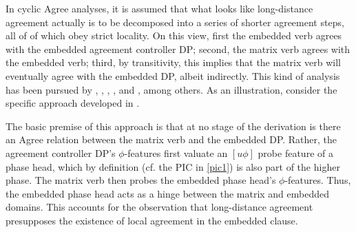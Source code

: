 \documentclass[output=paper
,modfonts
,nonflat]{langsci/langscibook}
\begin{document}
	In cyclic Agree analyses, it is assumed that what looks like long-distance
	agreement actually is to be decomposed into a series of shorter
	agreement steps, all of of which obey strict locality. On this view,
	first the embedded verb agrees with the embedded agreement controller
	DP; second, the matrix verb agrees with the embedded verb; third, by
	transitivity, this implies that the matrix verb will eventually agree
	with the embedded DP, albeit indirectly. This kind of analysis has
	been pursued by \cite{Butt:95}, \cite{Legate:05:pha}, \cite{Keine:08},
	\cite{Preminger:09}, and \cite{Lahne:12}, among others. As an
	illustration, consider the specific approach developed in
	\cite{Legate:05:pha}.
	
	The basic premise of this approach is that at no stage of the
	derivation is there an Agree relation between the matrix verb and the
	embedded DP.  Rather, the agreement controller DP's $\phi$-features
	first valuate an $[u\phi]$ probe feature of a phase head, which by
	definition (cf. the PIC in \ref{pic1}) is also part of the higher
	phase.  The matrix verb then probes the embedded phase head's
	$\phi$-features.  Thus, the embedded phase head acts as a hinge
	between the matrix and embedded domains.  This accounts for the
	observation that long-distance agreement presupposes the existence of
	local agreement in the embedded clause. 
	
\end{document}
